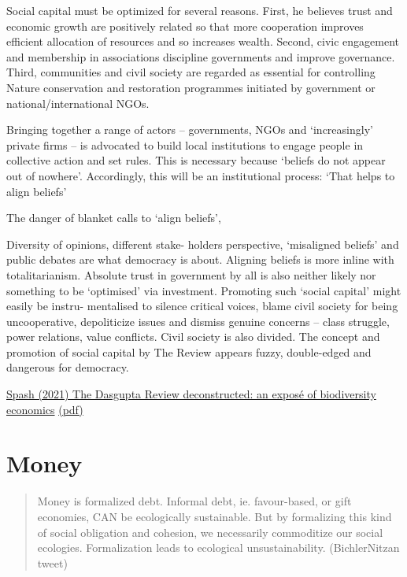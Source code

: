 \documentclass[
]{book}
\begin{document}
Social capital must be optimized for several reasons. First,
he believes trust and economic growth are positively related so that more cooperation improves
efficient allocation of resources and so increases wealth. Second, civic engagement and membership
in associations discipline governments and improve governance. Third, communities and civil
society are regarded as essential for controlling Nature conservation and restoration programmes
initiated by government or national/international NGOs.

Bringing together a range of actors -- governments,
NGOs and `increasingly' private firms -- is advocated to build local institutions to engage people
in collective action and set rules. This is necessary because `beliefs do not appear out of nowhere'.
Accordingly, this will be an institutional process: `That helps to align beliefs'

The danger of blanket calls to `align beliefs',

Diversity of opinions, different stake-
holders perspective, `misaligned beliefs' and public debates are what democracy is about. Aligning
beliefs is more inline with totalitarianism. Absolute trust in government by all is also neither likely
nor something to be `optimised' via investment. Promoting such `social capital' might easily be instru-
mentalised to silence critical voices, blame civil society for being uncooperative, depoliticize issues and
dismiss genuine concerns -- class struggle, power relations, value conflicts. Civil society is also divided.
The concept and promotion of
social capital by The Review appears fuzzy, double-edged and dangerous for democracy.

\href{https://www.tandf\%20online.com/doi/full/10.1080/14747731.2021.1929007}{Spash (2021) The Dasgupta Review deconstructed: an exposé of biodiversity economics}
\href{pdf/Spash_2021_Dasgupta_Deconstructed.pdf}{(pdf)}

\hypertarget{money}{%
\chapter{Money}\label{money}}

\begin{quote}
Money is formalized debt.
Informal debt, ie. favour-based, or gift economies, CAN be ecologically sustainable.
But by formalizing this kind of social obligation and cohesion, we necessarily commoditize our social ecologies. Formalization leads to ecological unsustainability. (BichlerNitzan tweet)
\end{quote}
\end{document}
